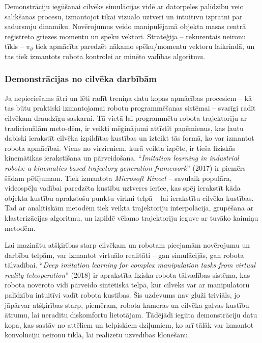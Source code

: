 \documentclass[12pt, a4paper]{article}
\numberwithin{equation}{section} %
\begin{document}
Demonstrāciju iegūšanai cilvēks simulācijas vidē ar datorpeles palīdzību veic salikšanas procesu, izmantojot tikai vizuālo uztveri un intuitīvu izpratni par sadursmju dinamiku. Novērojumus veido manipulējamā objekta masas centrā reģistrēto griezes momentu un spēku vektori. Stratēģija -- rekurentais neironu tīkls -- $\pi_{\theta}$ tiek apmācīta paredzēt nākamo spēku/momentu vektoru laikrindā, un tas tiek izmantots robota kontrolei ar minēto vadības algoritmu.

\subsubsection{Demonstrācijas no cilvēka darbībām}

Ja nepieciešams ātri un lēti radīt treniņa datu kopas apmācības procesiem -- kā tas  būtu praktiski izmantojamai robotu programmēšanas sistēmai -- svarīgi radīt cilvēkam draudzīgu saskarni. Tā vietā lai programmētu robota trajektoriju ar tradicionālām meto-dēm, ir veikti mēģinājumi attīstīt paņēmienus, kas ļautu dabiski ierakstīt cilvēka izpildītas kustības un izteikt tās formā, ko var izmantot robota apmācībai. Viens no virzieniem, kurā veikta izpēte, ir tieša fiziskās kinemātikas ierakstīšana un pārveidošana. ``\textit{Imitation learning in industrial robots: a kinematics based trajectory generation framework}'' \cite{jha2017imitation} (2017) ir piemērs šādam pētījumam. Tiek izmantota \textit{Microsoft Kinect} -- savulaik populāra, videospēļu vadībai paredzēta kustību uztveres ierīce, kas spēj ierakstīt kāda objekta kustību aprakstošu punktu virkni telpā -- lai ierakstītu cilvēka kustības. Tad ar analītiskām metodēm tiek veikta trajektoriju interpolācija, grupēšana ar klasterizācijas algoritmu, un izpildē vēlamo trajektoriju ieguve ar tuvāko kaimiņu metodēm.

Lai mazinātu atšķirības starp cilvēkam un robotam pieejamām novērojumu un darbību telpām, var izmantot virtuālo realitāti -- gan simulācijās, gan robota tālvadībai. ``\textit{Deep imitation learning for complex manipulation tasks from virtual reality teleoperation}'' \cite{zhang2018deep} (2018) ir aprakstīta fiziska robota tālvadības sistēma, kas robota novēroto vidi pārveido sintētiskā telpā, kur cilvēks var ar manipulatoru palīdzību intuitīvi vadīt robota kustības. Šis uzdevums nav gluži triviāls, jo jāpārvar atšķirības starp, piemēram, robota kameras un cilvēka galvas kustību ātrumu, lai neradītu diskomfortu lietotājam. Tādējādi iegūta demonstrāciju datu kopa, kas sastāv no attēliem un telpiskiem dziļumiem, ko arī tālāk var izmantot konvolūciju neironu tīklā, lai realizētu uzvedības klonēšanu.
\end{document}
